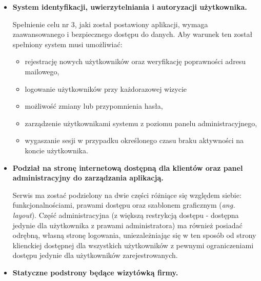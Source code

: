 \begin{itemize}
    \item \textbf{System identyfikacji, uwierzytelniania i autoryzacji
    użytkownika.}
    
    Spełnienie celu nr 3, jaki został postawiony aplikacji, wymaga zaawansowanego i bezpiecznego dostępu do danych. Aby warunek ten został spełniony system musi umożliwiać:
    \begin{itemize}
        \item rejestrację nowych użytkowników oraz weryfikację poprawności adresu mailowego,
        \item logowanie użytkowników przy każdorazowej wizycie
        \item możliwość zmiany lub przypomnienia hasła,
        \item zarządzenie użytkownikami systemu z poziomu panelu administracyjnego,
        \item wygaszanie sesji w przypadku określonego czasu braku aktywności na koncie użytkownika.
    \end{itemize}

    \item \textbf{Podział na stronę internetową dostępną dla klientów oraz panel administracyjny do zarządzania aplikacją.}
    
    Serwis ma zostać podzielony na dwie części różniące się względem siebie: funkcjonalnościami, prawami dostępu oraz szablonem graficznym (\textit{ang. layout}). Część administracyjna (z większą restrykcją dostępu - dostępna jedynie dla użytkownika z prawami administratora) ma również posiadać odrębną, własną stronę logowania, uniezależniając się w ten sposób od strony klienckiej dostępnej dla wszystkich użytkowników z pewnymi ograniczeniami dostępu jedynie dla użytkowników zarejestrowanych.
    
    \item \textbf{Statyczne podstrony będące wizytówką firmy.}
    

\end{itemize}
